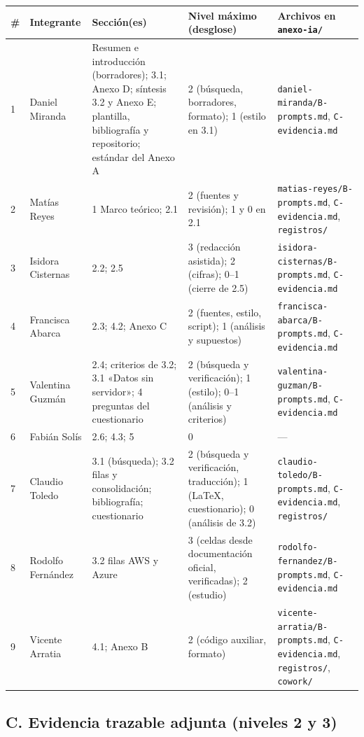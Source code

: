 \documentclass[12pt, letterpaper, table, xcdraw]{inf-pucv}
\begin{document}
{\scriptsize
\begin{longtable}{|p{0.5cm}|p{2.4cm}|p{4.8cm}|p{2.5cm}|p{3.4cm}|}
    \hline
    \textbf{\#} & \textbf{Integrante} & \textbf{Sección(es)} & \textbf{Nivel máximo (desglose)} & \textbf{Archivos en \texttt{anexo-ia/}} \\
    \hline
    \endhead
    1 & Daniel Miranda & Resumen e introducción (borradores); 3.1; Anexo D; síntesis 3.2 y Anexo E; plantilla, bibliografía y repositorio; estándar del Anexo A & 2 (búsqueda, borradores, formato); 1 (estilo en 3.1) & \texttt{daniel-miranda/B-prompts.md}, \texttt{C-evidencia.md} \\ \hline
    2 & Matías Reyes & 1 Marco teórico; 2.1 & 2 (fuentes y revisión); 1 y 0 en 2.1 & \texttt{matias-reyes/B-prompts.md}, \texttt{C-evidencia.md}, \texttt{registros/} \\ \hline
    3 & Isidora Cisternas & 2.2; 2.5 & 3 (redacción asistida); 2 (cifras); 0--1 (cierre de 2.5) & \texttt{isidora-cisternas/B-prompts.md}, \texttt{C-evidencia.md} \\ \hline
    4 & Francisca Abarca & 2.3; 4.2; Anexo C & 2 (fuentes, estilo, script); 1 (análisis y supuestos) & \texttt{francisca-abarca/B-prompts.md}, \texttt{C-evidencia.md} \\ \hline
    5 & Valentina Guzmán & 2.4; criterios de 3.2; 3.1 «Datos sin servidor»; 4 preguntas del cuestionario & 2 (búsqueda y verificación); 1 (estilo); 0--1 (análisis y criterios) & \texttt{valentina-guzman/B-prompts.md}, \texttt{C-evidencia.md} \\ \hline
    6 & Fabián Solís & 2.6; 4.3; 5 & 0 & --- \\ \hline
    7 & Claudio Toledo & 3.1 (búsqueda); 3.2 filas y consolidación; bibliografía; cuestionario & 2 (búsqueda y verificación, traducción); 1 (\LaTeX, cuestionario); 0 (análisis de 3.2) & \texttt{claudio-toledo/B-prompts.md}, \texttt{C-evidencia.md}, \texttt{registros/} \\ \hline
    8 & Rodolfo Fernández & 3.2 filas AWS y Azure & 3 (celdas desde documentación oficial, verificadas); 2 (estudio) & \texttt{rodolfo-fernandez/B-prompts.md}, \texttt{C-evidencia.md} \\ \hline
    9 & Vicente Arratia & 4.1; Anexo B & 2 (código auxiliar, formato) & \texttt{vicente-arratia/B-prompts.md}, \texttt{C-evidencia.md}, \texttt{registros/}, \texttt{cowork/} \\ \hline
\end{longtable}
}

\subsection*{C. Evidencia trazable adjunta (niveles 2 y 3)}
\end{document}
